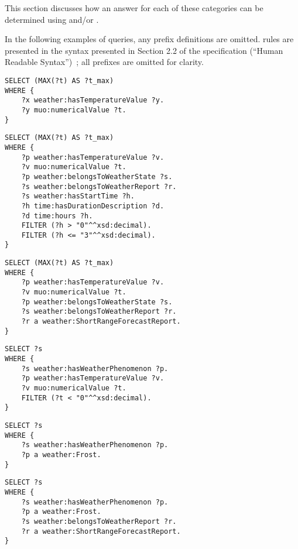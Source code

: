 This section discusses how an answer for each of these categories can be determined using  and/or .

In the following examples of  queries, any prefix definitions are omitted.  rules are presented in the syntax presented in Section 2.2 of the  specification (``Human Readable Syntax'')~\cite{SWRL}; all prefixes are omitted for clarity.


\begin{lstlisting}
SELECT (MAX(?t) AS ?t_max)
WHERE {
    ?x weather:hasTemperatureValue ?y.
    ?y muo:numericalValue ?t.
}
\end{lstlisting}

\begin{lstlisting}
SELECT (MAX(?t) AS ?t_max)
WHERE {
    ?p weather:hasTemperatureValue ?v.
    ?v muo:numericalValue ?t.
    ?p weather:belongsToWeatherState ?s.
    ?s weather:belongsToWeatherReport ?r.
    ?s weather:hasStartTime ?h.
    ?h time:hasDurationDescription ?d.
    ?d time:hours ?h.
    FILTER (?h > "0"^^xsd:decimal).
    FILTER (?h <= "3"^^xsd:decimal).
}
\end{lstlisting}

\begin{lstlisting}
SELECT (MAX(?t) AS ?t_max)
WHERE {
    ?p weather:hasTemperatureValue ?v.
    ?v muo:numericalValue ?t.
    ?p weather:belongsToWeatherState ?s.
    ?s weather:belongsToWeatherReport ?r.
    ?r a weather:ShortRangeForecastReport.
}
\end{lstlisting}

\begin{lstlisting}
SELECT ?s
WHERE {
    ?s weather:hasWeatherPhenomenon ?p.
    ?p weather:hasTemperatureValue ?v.
    ?v muo:numericalValue ?t.
    FILTER (?t < "0"^^xsd:decimal).
}
\end{lstlisting}

\begin{lstlisting}
SELECT ?s
WHERE {
    ?s weather:hasWeatherPhenomenon ?p.
    ?p a weather:Frost.
}
\end{lstlisting}

\begin{lstlisting}
SELECT ?s
WHERE {
    ?s weather:hasWeatherPhenomenon ?p.
    ?p a weather:Frost.
    ?s weather:belongsToWeatherReport ?r.
    ?r a weather:ShortRangeForecastReport.
}
\end{lstlisting}

